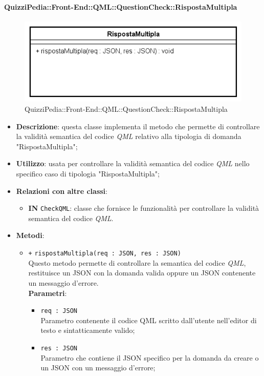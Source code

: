 \paragraph[QuizziPedia::Front-End::QML:: \\ QuestionCheck::RispostaMultipla]{QuizziPedia::Front-End::QML::QuestionCheck::RispostaMultipla}
\begin{figure} [ht]
	\centering
	\includegraphics[scale=0.32]{UML/Classi/Front-End/QuizziPedia_Front-end_QML_QuestionCheck_RispostaMultipla.png}
	\caption{QuizziPedia::Front-End::QML::QuestionCheck::RispostaMultipla}
\end{figure} \FloatBarrier
\begin{itemize}
	\item \textbf{Descrizione}: questa classe implementa il metodo che permette di controllare la validità semantica del codice \textit{QML} relativo alla tipologia di domanda "RispostaMultipla";
	\item \textbf{Utilizzo}: usata per controllare la validità semantica del codice \textit{QML} nello specifico caso di tipologia "RispostaMultipla";
	\item \textbf{Relazioni con altre classi}:
	\begin{itemize}
		\item \textbf{IN} \texttt{CheckQML}: classe che fornisce le funzionalità per controllare la validità semantica del codice \textit{QML}.
	\end{itemize}
	\item \textbf{Metodi}:
	\begin{itemize}
		\item \texttt{+} \texttt{rispostaMultipla(req : JSON, res : JSON)} \\
		Questo metodo permette di controllare la semantica del codice \textit{QML}, restituisce un JSON con la domanda valida oppure un JSON contenente un messaggio d'errore. \\
		\textbf{Parametri}:
		\begin{itemize}
			\item \texttt{req : JSON} \\
			Parametro contenente il codice QML scritto dall'utente nell'editor di testo e sintatticamente valido;
			\item \texttt{res : JSON} \\
			Parametro che contiene il JSON specifico per la domanda da creare o un JSON con un messaggio d'errore;
		\end{itemize}
	\end{itemize}
\end{itemize}

